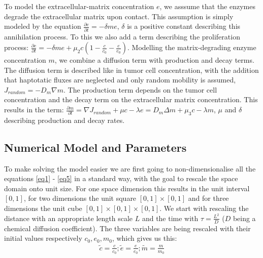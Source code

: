 To model the extracellular-matrix concentration $e$, we asssume that the enzymes degrade the extracellular matrix upon contact. This assumption is simply modeled by the equation $\frac{\partial e}{\partial t} = -\delta m e$, $\delta$ is a positive constant describing this annihilation process. To this we also add a term describing the proliferation process: $\frac{\partial e}{\partial t} = -\delta m e + \mu_2 c (1 - \frac{c}{c_0} - \frac{e}{e_0})$.\newline 
Modelling the matrix-degrading enzyme concentration $m$, we combine a diffusion term with production and decay terms. The diffusion term is described like in tumor cell concentration, with the addition that haptotatic fluxes are neglected and only random mobility is assumed, $J_{random} = -D_m \nabla m$. The production term depends on the tumor cell concentration and the decay term on the extracellular matrix concentration. This results in the term: $\frac{\partial m}{\partial t} = \nabla J_{random} + \mu c - \lambda e = D_m \Delta m + \mu_3 c - \lambda m$, $\mu$ and $\delta$ describing production and decay rates.


\subsection{Numerical Model and Parameters}

To make solving the model easier we are first going to non-dimensionalise all the equations \ref*{eq1} - \ref*{eq5} in a standard way, with the goal to rescale the space domain onto unit size. For one space dimension this results in the unit interval $[0,1]$, for two dimensions the unit square $[0,1] \times [0,1]$ and for three dimensions the unit cube $[0,1] \times [0,1] \times [0,1]$. 
We start with rescaling the distance with an appropriate length scale $L$ and the time with $\tau = \frac{L^2}{D}$ ($D$ being a chemical diffusion coefficient). The three variables are being rescaled with their initial values respectively $c_0, e_0, m_0$, which gives us this:
\begin{align}
    \tilde{c} = \frac{c}{c_0};  \tilde{e} = \frac{e}{e_0};  \tilde{m} = \frac{m}{m_0}  
\end{align}

